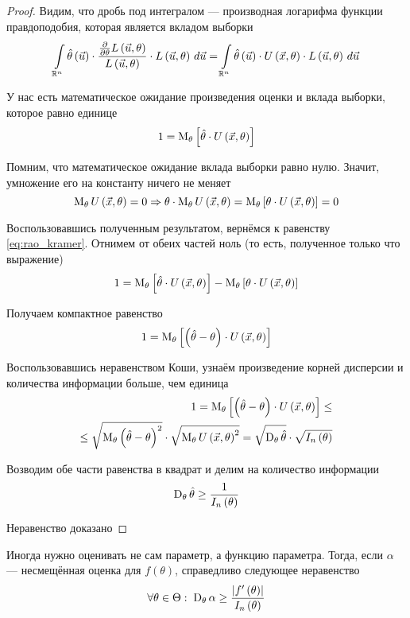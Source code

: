 \begin{proof}
  Видим, что дробь под интегралом --- производная логарифма
  функции правдоподобия, которая является вкладом выборки
  $$\integral{\mathbb{R}^n}{}{\vec{u}}{\hat{\theta}\left( \vec{u} \right)
    \cdot \frac{
      \frac{\partial}{\partial \theta}L\left( \vec{u},\theta \right)}
      {L\left( \vec{u},\theta \right)}
        \cdot L\left( \vec{u},\theta \right)}
    = \integral{\mathbb{R}^n}{}{\vec{u}}{\hat{\theta}\left( \vec{u} \right)
      \cdot
        U\left( \vec{x},\theta \right)
          \cdot L\left( \vec{u},\theta \right)}$$

  У нас есть математическое ожидание произведения оценки и вклада выборки,
  которое равно единице
  \begin{equation}\label{eq:rao_kramer}
    1 = \Meanof{\theta}{\hat{\theta}\cdot U\left( \vec{x},\theta \right)}
  \end{equation}

  Помним, что математическое ожидание вклада выборки равно нулю.
  Значит, умножение его на константу ничего не меняет
  $$\meanof{\theta}{U\left( \vec{x},\theta \right)}=0
    \Rightarrow 
    \theta\cdot\meanof{\theta}{U\left( \vec{x},\theta \right)}
    = \Meanof{\theta}{\theta\cdot U\left(\vec{x},\theta\right)}
    = 0$$

  Воспользовавшись полученным результатом,
  вернёмся к равенству \eqref{eq:rao_kramer}.
  Отнимем от обеих частей ноль (то есть, полученное только что выражение)
  $$1 = \Meanof{\theta}{\hat{\theta}\cdot U\left( \vec{x},\theta \right)}
    - \Meanof{\theta}{\theta\cdot U\left(\vec{x},\theta\right)}$$

  Получаем компактное равенство
  $$1 = \Meanof{\theta}{\left(\hat{\theta}-\theta\right)
    \cdot U\left( \vec{x},\theta \right)}$$

  Воспользовавшись неравенством Коши, узнаём
  произведение корней дисперсии и количества информации больше, чем единица
  \begin{equation}\label{eq:rao_kramer_koshi}
    \begin{split}
    1 = \meanof{\theta}{
      \left[\left(\hat{\theta}-\theta\right)
        \cdot U\left( \vec{x},\theta \right)\right]} \le \\
    \le \sqrt{\meanof{\theta}{
      \left(\hat{\theta}-\theta\right)^2}}
      \cdot\sqrt{\meanof{\theta}{U\left( \vec{x},\theta \right)^2}}
    = \sqrt{\dispersionof{\theta}{\hat{\theta}}}
      \cdot\sqrt{I_n\left(\theta\right)}
    \end{split}
  \end{equation}

  Возводим обе части равенства в квадрат и делим на количество информации
  $$\dispersionof{\theta}{\hat{\theta}}\ge \frac{1}{I_n\left(\theta\right)}$$

  Неравенство доказано
\end{proof}
\begin{remark}
  Иногда нужно оценивать не сам параметр, а функцию параметра.
  Тогда, если $\alpha$ --- несмещённая оценка для $f\left(\theta\right)$,
  справедливо следующее неравенство
  $$\forall\theta\in\Theta:\;\dispersionof{\theta}{\alpha}
    \ge\frac{\left|f'\left(\theta\right)\right|}{I_n\left(\theta\right)}$$
\end{remark}

